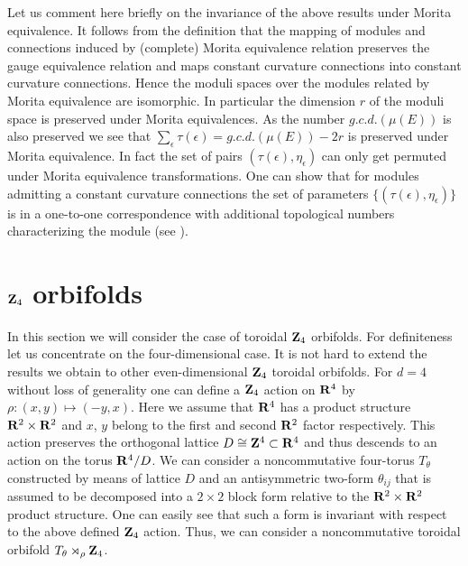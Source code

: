 \documentclass[a4paper,a4paper]{article}
\begin{document}
{Let us comment here briefly on the invariance of the above results under  Morita equivalence. It follows from the definition  that the mapping 
of modules and connections induced by (complete) Morita equivalence relation preserves the gauge equivalence relation and 
maps constant curvature connections into constant curvature connections. Hence the moduli spaces over the modules related by Morita equivalence are 
isomorphic.
In particular the  dimension $r$ of the moduli space  is preserved under Morita equivalences. As the number $g.c.d. (\mu(E))$ 
is also preserved we see that 
$\sum_{\epsilon} \tau(\epsilon) = g.c.d. (\mu(E)) - 2r$
is preserved under Morita equivalence. In fact the set of pairs  $(\tau(\epsilon), \eta_{\epsilon})$ can only get 
permuted under  Morita equivalence transformations. One can show that for modules admitting a constant curvature connections 
the set of parameters  $\{(\tau(\epsilon), \eta_{\epsilon})\}$ is in a one-to-one correspondence with additional 
topological numbers characterizing the module (see \cite{z2}). 



\section{${\bf Z}_{4}$ orbifolds}
In this section we will consider the case of toroidal ${\bf Z}_{4}$ orbifolds. For definiteness let us 
concentrate on the four-dimensional case. It is not hard to extend the results we  obtain to other 
even-dimensional  ${\bf Z}_{4}$ toroidal orbifolds. For $d=4$ without loss of generality one can define a  ${\bf Z}_{4}$ action on ${\bf R}^{4}$ by
$\rho: (x,y) \mapsto (-y, x)$. Here we assume that ${\bf R}^{4}$ has a product structure ${\bf R}^{2}\times  {\bf R}^{2}$ and 
    $x$, $y$  belong   to the first and second ${\bf R}^{2}$ factor respectively. This action preserves the orthogonal 
lattice $D\cong {\bf Z}^{4}\subset {\bf R}^{4}$ and thus descends to an action on the torus $ {\bf R}^{4}/D$. 
We can consider a noncommutative four-torus $T_{\theta}$ constructed by means of lattice $D$ and an antisymmetric 
two-form $\theta_{ij}$ that is assumed to be decomposed into a $2\times 2$ block form relative to the  ${\bf R}^{2}\times  {\bf R}^{2}$ 
product   structure. One can easily see that such a form is invariant with respect to the above defined  ${\bf Z}_{4}$ action.  
Thus, we can consider a noncommutative toroidal orbifold $T_{\theta}\rtimes_{\rho}{\bf Z}_{4}$. 


}
\end{document}
